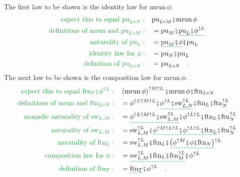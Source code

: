 The first law to be shown is the identity law for $\text{mrun}\,\phi$:
\begin{align*}
{\color{greenunder}\text{expect this to equal }\text{pu}_{L\circ N}:}\quad & \text{pu}_{L\circ M}\bef\text{mrun}\,\phi\\
{\color{greenunder}\text{definitions of }\text{mrun}\text{ and }\text{pu}_{L\circ M}:}\quad & =\text{pu}_{M}\bef\gunderline{\text{pu}_{L}\bef\phi^{\uparrow L}}\\
{\color{greenunder}\text{naturality of }\text{pu}_{L}:}\quad & =\gunderline{\text{pu}_{M}\bef\phi}\bef\text{pu}_{L}\\
{\color{greenunder}\text{identity law for }\phi:}\quad & =\text{pu}_{N}\bef\text{pu}_{L}\\
{\color{greenunder}\text{definition of }\text{pu}_{L\circ N}:}\quad & =\text{pu}_{L\circ N}\quad.
\end{align*}
The next law to be shown is the composition law for $\text{mrun}\,\phi$:
\begin{align*}
{\color{greenunder}\text{expect this to equal }\text{ftn}_{T}\bef\phi^{\uparrow L}:}\quad & \left(\text{mrun}\,\phi\right)^{\uparrow M\uparrow L}\bef\text{mrun}\,\phi\bef\text{ftn}_{L\circ N}\\
{\color{greenunder}\text{definitions of }\text{mrun}\text{ and }\text{ftn}_{L\circ N}:}\quad & =\phi^{\uparrow L\uparrow M\uparrow L}\bef\gunderline{\phi^{\uparrow L}\bef\text{sw}_{L,N}^{\uparrow L}}\bef\text{ftn}_{L}\bef\text{ftn}_{N}^{\uparrow L}\\
{\color{greenunder}\text{monadic naturality of }\text{sw}_{L,M}:}\quad & =\gunderline{\phi^{\uparrow L\uparrow M\uparrow L}\bef\text{sw}_{L,M}^{\uparrow L}}\bef\phi^{\uparrow L\uparrow L}\bef\text{ftn}_{L}\bef\text{ftn}_{N}^{\uparrow L}\\
{\color{greenunder}\text{naturality of }\text{sw}_{L,M}:}\quad & =\text{sw}_{L,M}^{\uparrow L}\bef\gunderline{\phi^{\uparrow M\uparrow L\uparrow L}\bef\phi^{\uparrow L\uparrow L}\bef\text{ftn}_{L}}\bef\text{ftn}_{N}^{\uparrow L}\\
{\color{greenunder}\text{naturality of }\text{ftn}_{L}:}\quad & =\text{sw}_{L,M}^{\uparrow L}\bef\text{ftn}_{L}\bef\gunderline{\left(\phi^{\uparrow M}\bef\phi\bef\text{ftn}_{N}\right)}^{\uparrow L}\\
{\color{greenunder}\text{composition law for }\phi:}\quad & =\gunderline{\text{sw}_{L,M}^{\uparrow L}\bef\text{ftn}_{L}\bef\text{ftn}_{M}^{\uparrow L}}\bef\phi^{\uparrow L}\\
{\color{greenunder}\text{definition of }\text{ftn}_{T}:}\quad & =\gunderline{\text{ftn}_{T}}\bef\phi^{\uparrow L}\quad.
\end{align*}
